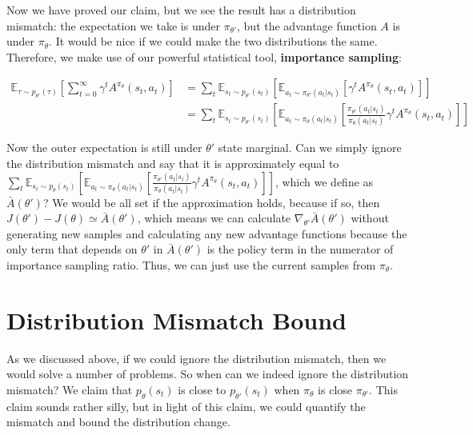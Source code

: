 Now we have proved our claim, but we see the result has a distribution mismatch: the expectation we take is under $\pi_{\theta'}$, but the advantage function $A$ is under $\pi_\theta$. It would be nice if we could make the two distributions the same. Therefore, we make use of our powerful statistical tool, \textbf{importance sampling}:

\begin{align*}
\mathbb{E}_{\tau\sim p_{\theta'}(\tau)}\left[\sum_{t=0}^\infty\gamma^tA^{\pi_\theta}(s_t,a_t)\right] &= \sum_t\mathbb{E}_{s_t\sim p_{\theta'}(s_t)}\left[\mathbb{E}_{a_t\sim \pi_{\theta'}(a_t|s_t)}\left[\gamma^t A^{\pi_\theta}(s_t,a_t)\right]\right]\\
&=\sum_t\mathbb{E}_{s_t\sim p_{\theta'}(s_t)}\left[\mathbb{E}_{a_t\sim \pi_{\theta}(a_t|s_t)}\left[\frac{\pi_{\theta'}(a_t|s_t)}{\pi_\theta(a_t|s_t)}\gamma^t A^{\pi_\theta}(s_t,a_t)\right]\right]
\end{align*}

Now the outer expectation is still under $\theta'$ state marginal. Can we simply ignore the distribution mismatch and say that it is approximately equal to $\sum_t\mathbb{E}_{s_t\sim p_{\theta}(s_t)}\left[\mathbb{E}_{a_t\sim \pi_{\theta}(a_t|s_t)}\left[\frac{\pi_{\theta'}(a_t|s_t)}{\pi_\theta(a_t|s_t)}\gamma^t A^{\pi_\theta}(s_t,a_t)\right]\right]$, which we define as $\bar{A}(\theta')$? We would be all set if the approximation holds, because if so, then $J(\theta') - J(\theta) \simeq \bar{A}(\theta')$, which means we can calculate $\nabla_{\theta'}\bar{A}(\theta')$ without generating new samples and calculating any new advantage functions because the only term that depends on $\theta'$ in $\bar{A}(\theta')$ is the policy term in the numerator of importance sampling ratio. Thus, we can just use the current samples from $\pi_\theta$.

\section{Distribution Mismatch Bound}
As we discussed above, if we could ignore the distribution mismatch, then we would solve a number of problems. So when can we indeed ignore the distribution mismatch? We claim that $p_\theta(s_t)$ is close to $p_{\theta'}(s_t)$ when $\pi_\theta$ is close $\pi_{\theta'}$. This claim sounds rather silly, but in light of this claim, we could quantify the mismatch and bound the distribution change.


